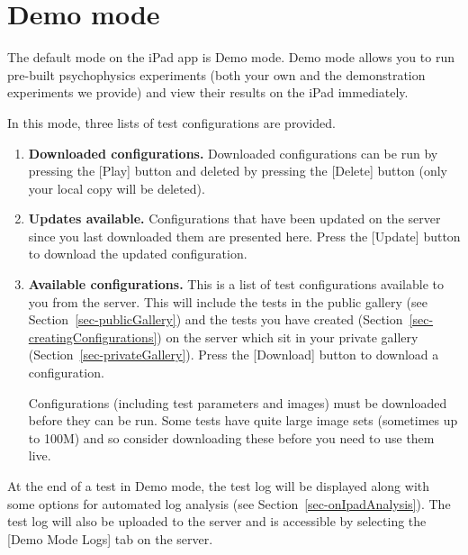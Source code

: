 \documentclass{article}
\begin{document}
\section{Demo mode}
\label{sec-demoMode}

The default mode on the iPad app is Demo mode. Demo mode allows you to run pre-built 
psychophysics experiments (both your own and the demonstration experiments we provide) 
and view their results on the iPad immediately.

In this mode, three lists of test configurations are provided.

\begin{enumerate}

\item {\bf Downloaded configurations.}
Downloaded configurations can be run by pressing the [Play] button and
deleted by pressing the [Delete] button (only your local copy will be
deleted).


\item {\bf Updates available.} Configurations that have been updated on
the server since you last downloaded them are presented here.
Press the [Update] button to download the updated configuration.

\item {\bf Available configurations.}
This is a list of test configurations available to you from the server.
This will include the tests in the public gallery (see
Section~\ref{sec-publicGallery}) and the tests you have created 
(Section~\ref{sec-creatingConfigurations})
on the server which sit in your private gallery 
(Section~\ref{sec-privateGallery}).
Press the [Download] button to download a configuration.

Configurations (including test parameters and images) must be
downloaded before they can be run.
Some tests have quite large image sets (sometimes up to 100M) and
so consider downloading these before you need to use them live.
\end{enumerate}

At the end of a test in Demo mode, the test log will be displayed along
with some options for automated log analysis (see
Section~\ref{sec-onIpadAnalysis}).
The test log will also be uploaded to the server and is accessible by
selecting the [Demo Mode Logs] tab on the server.
\end{document}
